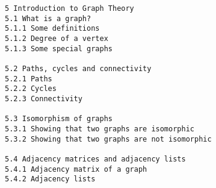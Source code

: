 \documentclass[a4paper,12pt]{article}
\begin{document}
\begin{verbatim}
5 Introduction to Graph Theory 
5.1 What is a graph?
5.1.1 Some definitions  
5.1.2 Degree of a vertex 
5.1.3 Some special graphs  

5.2 Paths, cycles and connectivity  
5.2.1 Paths 
5.2.2 Cycles  
5.2.3 Connectivity  

5.3 Isomorphism of graphs  
5.3.1 Showing that two graphs are isomorphic 
5.3.2 Showing that two graphs are not isomorphic
 
5.4 Adjacency matrices and adjacency lists  
5.4.1 Adjacency matrix of a graph 
5.4.2 Adjacency lists 

\end{verbatim}
\end{document}
